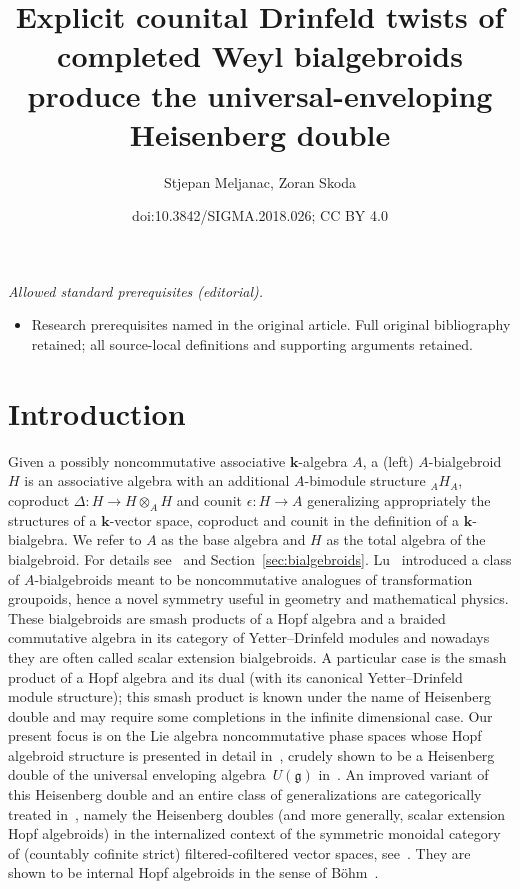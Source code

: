 \documentclass[10pt,a4paper]{amsart}
\title{Explicit counital Drinfeld twists of completed Weyl bialgebroids produce the universal-enveloping Heisenberg double}
\author{Stjepan Meljanac, Zoran Skoda}
\date{doi:10.3842/SIGMA.2018.026; CC BY 4.0}
\def\genfd{\mathbf{k}}
\def\gg{\mathfrak{g}}
\numberwithin{equation}{section}
\begin{document}
\maketitle
\noindent\textit{Allowed standard prerequisites (editorial).}\begin{itemize}
\item Research prerequisites named in the original article. Full original bibliography retained; all source-local definitions and supporting arguments retained.
\end{itemize}\medskip
\section{Introduction}\label{section1}

Given a possibly noncommutative associative $\mathbf{k}$-algebra $A$, a (left) $A$-bialgebroid $H$ is an associative algebra with an additional $A$-bimodule structure ${}_A H_A$, coproduct $\Delta \colon H\to H\otimes_A H$ and counit $\epsilon \colon H\to A$ generalizing appropriately the structures of a $\genfd$-vector space, coproduct and counit in the definition of a $\genfd$-bialgebra. We refer to $A$ as the base algebra and $H$ as the total algebra of the bialgebroid. For details see~\cite{bohmHbk,BrzMilitaru} and Section~\ref{sec:bialgebroids}. Lu~\cite{lu} introduced a class of $A$-bialgebroids meant to be noncommutative analogues of transformation groupoids, hence a novel symmetry useful in geometry and mathematical physics. These bialgebroids are smash products of a Hopf algebra and a braided commutative algebra in its category of Yetter--Drinfeld modules and nowadays they are often called scalar extension bialgebroids. A particular case is the smash product of a Hopf algebra and its dual (with its canonical Yetter--Drinfeld module structure); this smash product is known under the name of Heisenberg double and may require some completions in the infinite dimensional case. Our present focus is on the Lie algebra noncommutative phase spaces whose Hopf algebroid structure is presented in detail in~\cite{halg}, crudely shown to be a Heisenberg double of the universal enveloping algebra~$U(\gg)$ in~\cite{heisd}. An improved variant of this Heisenberg double and an entire class of generalizations are categorically treated in~\cite{stojicPhD}, namely the Heisenberg doubles (and more generally, scalar extension Hopf algebroids) in the internalized context of the symmetric monoidal category of (countably cofinite strict) filtered-cofiltered vector spaces, see~\cite{stojicPhD}. They are shown to be internal Hopf algebroids in the sense of B\"ohm~\cite{BohmInternal}.
\end{document}
